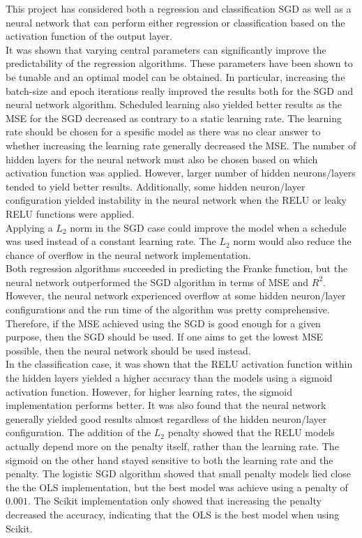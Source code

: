 \documentclass[12pt,a4paper]{article}
\begin{document}
\noindent This project has considered both a regression and classification SGD as well as a neural network that can perform either regression or classification based on the activation function of the output layer. 
\\
It was shown that varying central parameters can significantly improve the predictability of the regression algorithms. These parameters have been shown to be tunable and an optimal model can be obtained. In particular, increasing the batch-size and epoch iterations really improved the results both for the SGD and neural network algorithm. Scheduled learning also yielded better results as the MSE for the SGD decreased as contrary to a static learning rate. The learning rate should be chosen for a spesific model as there was no clear answer to whether increasing the learning rate generally decreased the MSE. The number of hidden layers for the neural network must also be chosen based on which activation function was applied. However, larger number of hidden neurons/layers tended to yield better results. Additionally, some hidden neuron/layer configuration yielded instability in the neural network when the RELU or leaky RELU functions were applied.
\\
Applying a $L_2$ norm in the SGD case could improve the model when a schedule was used instead of a constant learning rate. The $L_2$ norm would also reduce the chance of overflow in the neural network implementation.
\\
Both regression algorithms succeeded in predicting the Franke function, but the neural network outperformed the SGD algorithm in terms of MSE and $R^2$. However, the neural network experienced overflow at some hidden neuron/layer configurations and the run time of the algorithm was pretty comprehensive. Therefore, if the MSE achieved using the SGD is good enough for a given purpose, then the SGD should be used. If one aims to get the lowest MSE possible, then the neural network should be used instead.
\\
In the classification case, it was shown that the RELU activation function within the hidden layers yielded a higher accuracy than the models using a sigmoid activation function. However, for higher learning rates, the sigmoid implementation performs better. It was also found that the neural network generally yielded good results almost regardless of the hidden neuron/layer configuration. The addition of the $L_2$ penalty showed that the RELU models actually depend more on the penalty itself, rather than the learning rate. The sigmoid on the other hand stayed sensitive to both the learning rate and the penalty. The logistic SGD algorithm showed that small penalty models lied close the the OLS implementation, but the best model was achieve using a penalty of $0.001$. The Scikit implementation only showed that increasing the penalty decreased the accuracy, indicating that the OLS is the best model when using Scikit. 
\end{document}
